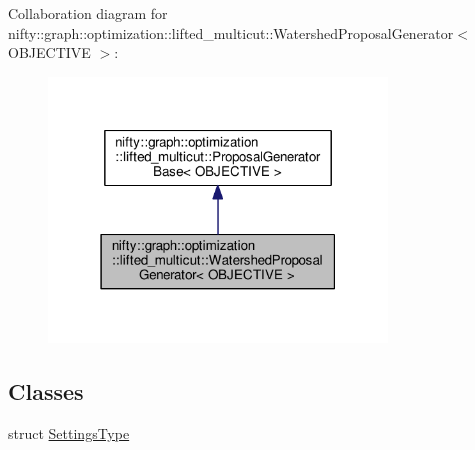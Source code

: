 Collaboration diagram for nifty\+:\+:graph\+:\+:optimization\+:\+:lifted\+\_\+multicut\+:\+:Watershed\+Proposal\+Generator$<$ O\+B\+J\+E\+C\+T\+I\+V\+E $>$\+:\nopagebreak
\begin{figure}[H]
\begin{center}
\leavevmode
\includegraphics[width=255pt]{classnifty_1_1graph_1_1optimization_1_1lifted__multicut_1_1WatershedProposalGenerator__coll__graph}
\end{center}
\end{figure}
\subsection*{Classes}
\begin{DoxyCompactItemize}
\item 
struct \hyperlink{structnifty_1_1graph_1_1optimization_1_1lifted__multicut_1_1WatershedProposalGenerator_1_1SettingsType}{Settings\+Type}
\end{DoxyCompactItemize}

